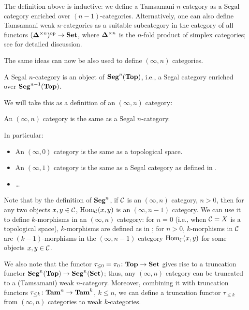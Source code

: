 \begin{remark}
  The definition above is inductive: we define a Tamsamani $n$-category as a
  Segal category enriched over $(n-1)$-categories. Alternatively, one can also
  define Tamsamani weak $n$-categories as a suitable subcategory in the category
  of all functors $(\mathbf{\Delta}^{\times n})^{\mathrm{op}}\to \mathbf{Set}$, where $\mathbf{\Delta}^{\times
  n}$ is the $n$-fold product of simplex categories; see \cite{paoli} for detailed
  discussion.
\end{remark}

The same ideas can now be also used to define $(\infty, n)$ categories.


\begin{definition}\label{d:segal-ncat}
  A Segal $n$-category is an object of $\mathbf{Seg}^n(\mathbf{Top})$, i.e., a Segal category
  enriched over $\mathbf{Seg}^{n-1}(\mathbf{Top})$.
\end{definition}


We will take this as a definition of an $(\infty, n)$ category:
\begin{definition}\label{d:infty-ncat}
  An $(\infty, n)$ category is the same as a Segal $n$-category.
\end{definition}

In particular:
\begin{itemize}
  \item An $(\infty, 0)$ category is the same as a topological space.
  \item An $(\infty, 1)$ category is the same as a Segal category as defined
    in .
  \item \dots
\end{itemize}

Note that by the definition of $\mathbf{Seg}^n$, if $\mathcal{C}$ is an $(\infty, n)$
category, $n>0$, then for any two objects $x,y\in \mathcal{C}$, $\operatorname{Hom}_{\mathcal{C}}(x,y)$ is
an $(\infty, n-1)$ category. We can use it to define $k$-morphisms in an
$(\infty, n)$ category: for $n=0$ (i.e., when $\mathcal{C}=X$ is a topological space),
$k$-morphisms are defined as in ; for $n>0$,
$k$-morphisms in $\mathcal{C}$ are $(k-1)$-morphisms in the $(\infty, n-1)$ category
$\operatorname{Hom}_{\mathcal{C}}(x,y)$ for some objects $x,y\in \mathcal{C}$.

We also note that the functor $\tau_{\leq 0}=\pi_0\colon \mathbf{Top}\to\mathbf{Set}$ gives rise to
a truncation functor $\mathbf{Seg}^n(\mathbf{Top})\to \mathbf{Seg}^n(\mathbf{Set})$; thus, any $(\infty, n)$
category can be truncated to a (Tamsamani) weak $n$-category. Moreover,
combining it with truncation functors $\tau_{\leq k}\colon \mathbf{Tam}^n\to \mathbf{Tam}^k$, $k
\le n$, we can define a truncation functor $\tau_{\leq k}$ from $(\infty, n)$
categories to weak $k$-categories.

